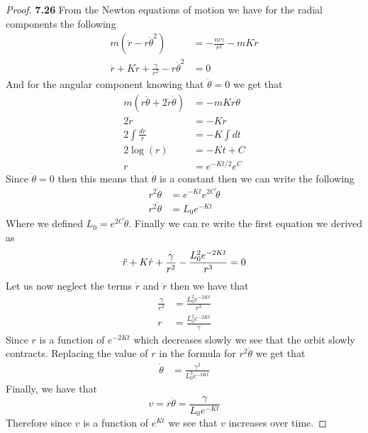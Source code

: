 \documentclass[11pt]{article}
\theoremstyle{definition}
\begin{document}
    \begin{proof}{\textbf{7.26}}
        From the Newton equations of motion we have for the radial components the
        following
        \begin{align*}
            m(\ddot{r} - r\dot{\theta}^2) &= -\frac{m\gamma}{r^2} - mK\dot{r}\\
            \ddot{r} + K\dot{r} + \frac{\gamma}{r^2} - r\dot{\theta}^2  &= 0
        \end{align*}
        And for the angular component knowing that $\ddot{\theta} = 0$ we get that
        \begin{align*}
            m(r\ddot{\theta} + 2\dot{r}\dot{\theta}) &= - mKr\dot{\theta}\\
            2\dot{r} &= - Kr\\
            2 \int \frac{dr}{r} &= -K \int dt\\ 
            2 \log(r) &= -Kt + C\\
            r &=  e^{-Kt/2}e^{C}
        \end{align*}
        Since $\ddot{\theta} = 0$ then this means that $\dot{\theta}$ is a constant then
        we can write the following
        \begin{align*}
            r^2\dot{\theta} &= e^{-Kt}e^{2C}\dot{\theta} \\
            r^2\dot{\theta} &= L_0e^{-Kt}
        \end{align*}
        Where we defined $L_0 = e^{2C}\dot{\theta}$. Finally we can re write the first
        equation we derived as
        $$\ddot{r} + K\dot{r} + \frac{\gamma}{r^2} - \frac{L_0^2e^{-2Kt}}{r^3} = 0\\$$
        Let us now neglect the terms $\dot{r}$ and $\ddot{r}$ then we have that
        \begin{align*}
            \frac{\gamma}{r^2} &= \frac{L_0^2e^{-2Kt}}{r^3}\\
            r &= \frac{L_0^2e^{-2Kt}}{\gamma}
        \end{align*}
        Since $r$ is a function of $e^{-2Kt}$ which decreases slowly we see that the
        orbit slowly contracts.
        Replacing the value of $r$ in the formula for $r^2\dot{\theta}$ we get that
        \begin{align*}
            \dot{\theta} &= \frac{\gamma^2}{L_0^3e^{-3Kt}}
        \end{align*}
        Finally, we have that
        $$v = r \dot{\theta} = \frac{\gamma}{L_0e^{-Kt}}$$
        Therefore since $v$ is a function of $e^{Kt}$ we see that $v$ increases over
        time.
    \end{proof}
\end{document}
